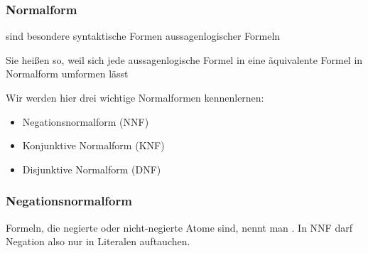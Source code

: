 \documentclass[aspectratio=1610,onlymath]{beamer}
\begin{document}
% 
% 
% 
% 
% 


\begin{frame}\frametitle{Normalform}

 sind besondere syntaktische Formen aussagenlogischer Formeln
\bigskip

Sie heißen so, weil sich jede aussagenlogische Formel in eine äquivalente Formel in Normalform umformen lässt
\bigskip

Wir werden hier drei wichtige Normalformen kennenlernen:
\begin{itemize}
\item \alert{Negationsnormalform} (NNF)
\item \alert{Konjunktive Normalform} (KNF)
\item \alert{Disjunktive Normalform} (DNF)
\end{itemize}

\end{frame}

\begin{frame}\frametitle{Negationsnormalform}

\medskip

Formeln, die negierte oder nicht-negierte Atome sind, nennt man .
In NNF darf Negation also nur in Literalen auftauchen.
\medskip\pause


\end{frame}
\end{document}
